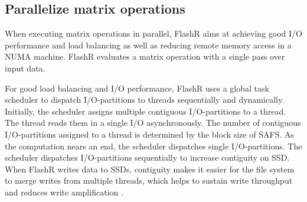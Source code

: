 
\subsection{Parallelize matrix operations}

When executing matrix operations in parallel, FlashR aims at achieving
good I/O performance and load balancing as well as reducing remote memory access
in a NUMA machine. FlashR evaluates a matrix operation with
a single pass over input data.

For good load balancing and I/O performance, FlashR uses a global task scheduler
to dispatch I/O-partitions to threads sequentially and dynamically. Initially,
the scheduler assigns
multiple contiguous I/O-partitions to a thread. The thread reads them in
a single I/O asynchronously. The number of contiguous I/O-partitions
assigned to a thread is determined by the block size of SAFS.
As the computation nears an end, the scheduler dispatches single I/O-partitions. 
The scheduler dispatches I/O-partitions sequentially to increase contiguity
on SSD. When FlashR writes data to SSDs,
contiguity makes it easier for the file system to merge
writes from multiple threads, which helps to sustain write throughput and reduces
write amplification \cite{ripq}.

